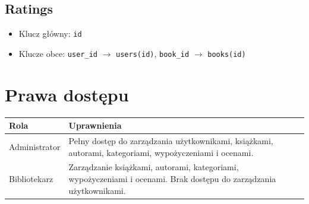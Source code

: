 \documentclass{article}
\begin{document}
\subsection*{Ratings}
\begin{itemize}
    \item Klucz główny: \texttt{id}
    \item Klucze obce: \texttt{user\_id} \(\rightarrow\) \texttt{users(id)}, \texttt{book\_id} \(\rightarrow\) \texttt{books(id)}
\end{itemize}

\section*{Prawa dostępu}
\begin{longtable}{|l|p{10cm}|}
\hline
\textbf{Rola} & \textbf{Uprawnienia} \\
\hline
Administrator & Pełny dostęp do zarządzania użytkownikami, książkami, autorami, kategoriami, wypożyczeniami i ocenami. \\
\hline
Bibliotekarz & Zarządzanie książkami, autorami, kategoriami, wypożyczeniami i ocenami. Brak dostępu do zarządzania użytkownikami. \\
\hline
\end{longtable}
\end{document}
